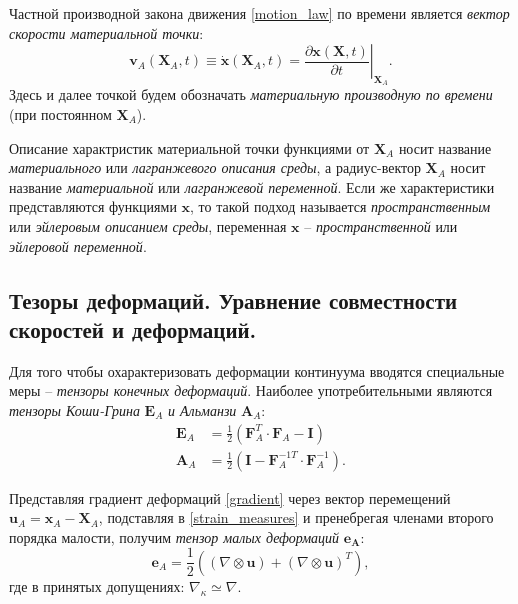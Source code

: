 	Частной производной закона движения \eqref{motion_law} по времени является \textit{вектор скорости материальной точки}:
\begin{equation}
	\label{velocity}
	\boldsymbol{v}_A(\boldsymbol{X}_A, t) \equiv \dot{\boldsymbol{x}}(\boldsymbol{X}_A, t) = \left.\frac{\partial\boldsymbol{x}(\boldsymbol{X}, t)}{\partial t}\right|_{\boldsymbol{X}_A}.
\end{equation}
	Здесь и далее точкой будем обозначать \textit{материальную производную по времени} (при постоянном $\boldsymbol{X}_A$).
	
	Описание характристик материальной точки функциями от $\boldsymbol{X}_A$ носит название \textit{материального} или \textit{лагранжевого описания среды}, а радиус-вектор $\textbf{X}_A$ носит название \textit{материальной} или \textit{лагранжевой переменной}. Если же характеристики представляются функциями $\boldsymbol{x}$, то такой подход называется \textit{пространственным} или \textit{эйлеровым описанием среды}, переменная $\boldsymbol{x}$ -- \textit{пространственной} или \textit{эйлеровой переменной}.

\subsection{Тезоры деформаций. Уравнение совместности скоростей и деформаций.}
	Для того чтобы охарактеризовать деформации континуума вводятся специальные меры -- \textit{тензоры конечных деформаций}. Наиболее употребительными являются \textit{тензоры Коши-Грина} $\boldsymbol{E}_A$ \textit{и Альманзи} $\boldsymbol{A}_A$:
\begin{align}
	\label{strain_measures}
	\boldsymbol{E}_A &= \frac{1}{2}\left(\boldsymbol{F}_A^T \cdot \boldsymbol{F}_A - \boldsymbol{I}\right)\\
	\boldsymbol{A}_A &= \frac{1}{2}\left(\boldsymbol{I} - \boldsymbol{F}_A^{-1T} \cdot \boldsymbol{F}_A^{-1}\right).
\end{align}

	Представляя градиент деформаций \eqref{gradient} через вектор перемещений $\boldsymbol{u}_A = \boldsymbol{x}_A - \boldsymbol{X}_A$, подставляя в \eqref{strain_measures} и пренебрегая членами второго порядка малости, получим \textit{тензор малых деформаций} $\boldsymbol{e_A}$:
\begin{equation}
	\label{small_strains}
	\boldsymbol{e}_A = \frac{1}{2}\left(\left(\nabla \otimes \boldsymbol{u}\right) + \left(\nabla\otimes \boldsymbol{u}\right)^T\right),
\end{equation}
	где в принятых допущениях: $\nabla_{\kappa} \simeq \nabla$.

